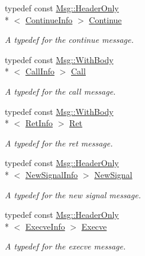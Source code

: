 \begin{DoxyCompactItemize}
\item 
typedef const \hyperlink{class_message_1_1_msg_a56cc5b2c5d898b85e97b1f3a46ab3999}{Msg\-::\-Header\-Only}\\*
$<$ \hyperlink{struct_message_1_1_continue_info}{Continue\-Info} $>$ \hyperlink{class_message_a40b27db67cec30a7b6f4dbdf76e5add2}{Continue}
\begin{DoxyCompactList}\small\item\em A typedef for the continue message. \end{DoxyCompactList}\item 
typedef const \hyperlink{class_message_1_1_msg_a385691f2f7fc10f0b4c1544b8892a6c9}{Msg\-::\-With\-Body}\\*
$<$ \hyperlink{struct_message_1_1_call_info}{Call\-Info} $>$ \hyperlink{class_message_a2f9064959df252bdfddff485438cfa4e}{Call}
\begin{DoxyCompactList}\small\item\em A typedef for the call message. \end{DoxyCompactList}\item 
typedef const \hyperlink{class_message_1_1_msg_a385691f2f7fc10f0b4c1544b8892a6c9}{Msg\-::\-With\-Body}\\*
$<$ \hyperlink{struct_message_1_1_ret_info}{Ret\-Info} $>$ \hyperlink{class_message_a7b1c7a41faeee12f538921a50e4c7d1b}{Ret}
\begin{DoxyCompactList}\small\item\em A typedef for the ret message. \end{DoxyCompactList}\item 
typedef const \hyperlink{class_message_1_1_msg_a56cc5b2c5d898b85e97b1f3a46ab3999}{Msg\-::\-Header\-Only}\\*
$<$ \hyperlink{struct_message_1_1_new_signal_info}{New\-Signal\-Info} $>$ \hyperlink{class_message_ae40f0243fd15231d8f44931e4adf7d3e}{New\-Signal}
\begin{DoxyCompactList}\small\item\em A typedef for the new signal message. \end{DoxyCompactList}\item 
typedef const \hyperlink{class_message_1_1_msg_a56cc5b2c5d898b85e97b1f3a46ab3999}{Msg\-::\-Header\-Only}\\*
$<$ \hyperlink{struct_message_1_1_execve_info}{Execve\-Info} $>$ \hyperlink{class_message_a0cb7454c0388a6df9b83b205b58028cf}{Execve}
\begin{DoxyCompactList}\small\item\em A typedef for the execve message. \end{DoxyCompactList}\item 

\end{DoxyCompactItemize}
